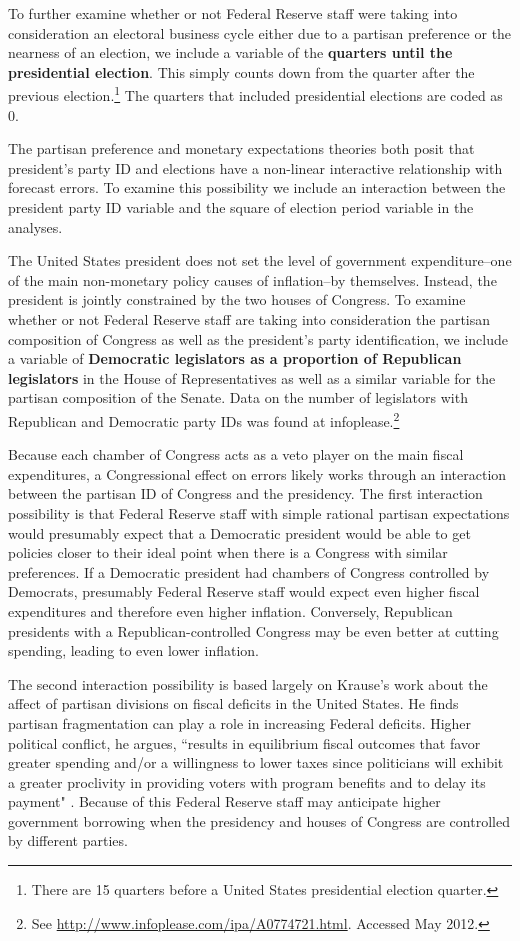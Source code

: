 \documentclass[a4paper]{article}\usepackage{graphicx, color}
\begin{document}
To further examine whether or not Federal Reserve staff were taking into consideration an electoral business cycle either due to a partisan preference or the nearness of an election, we include a variable of the {\bf{quarters until the presidential election}}. This simply counts down from the quarter after the previous election.\footnote{There are 15 quarters before a United States presidential election quarter.} The quarters that included presidential elections are coded as 0. 

The partisan preference and monetary expectations theories both posit that president's party ID and elections have a non-linear interactive relationship with forecast errors. To examine this possibility we include an interaction between the president party ID variable and the square of election period variable in the analyses.

The United States president does not set the level of government expenditure--one of the main non-monetary policy causes of inflation--by themselves. Instead, the president is jointly constrained by the two houses of Congress. To examine whether or not Federal Reserve staff are taking into consideration the partisan composition of Congress as well as the president's party identification, we include a variable of {\bf{Democratic legislators as a proportion of Republican legislators}} in the House of Representatives as well as a similar variable for the partisan composition of the Senate. Data on the number of legislators with Republican and Democratic party IDs was found at infoplease.\footnote{See {\url{http://www.infoplease.com/ipa/A0774721.html}}. Accessed May 2012.} 

Because each chamber of Congress acts as a veto player on the main fiscal expenditures, a Congressional effect on errors likely works through an interaction between the partisan ID of Congress and the presidency. The first interaction possibility is that Federal Reserve staff with simple rational partisan expectations would presumably expect that a Democratic president would be able to get policies closer to their ideal point when there is a Congress with similar preferences. If a Democratic president had chambers of Congress controlled by Democrats, presumably Federal Reserve staff would expect even higher fiscal expenditures and therefore even higher inflation. Conversely, Republican presidents with a Republican-controlled Congress may be even better at cutting spending, leading to even lower inflation.

The second interaction possibility is based largely on Krause's \citeyearpar{Krause2000} work about the affect of partisan divisions on fiscal deficits in the United States. He finds partisan fragmentation can play a role in increasing Federal deficits. Higher political conflict, he argues, ``results in equilibrium fiscal outcomes that favor greater spending and/or a willingness to lower taxes since politicians will exhibit a greater proclivity in providing voters with program benefits and to delay its payment" \citep[][542]{Krause2000}. Because of this Federal Reserve staff may anticipate higher government borrowing when the presidency and houses of Congress are controlled by different parties. 
\end{document}
